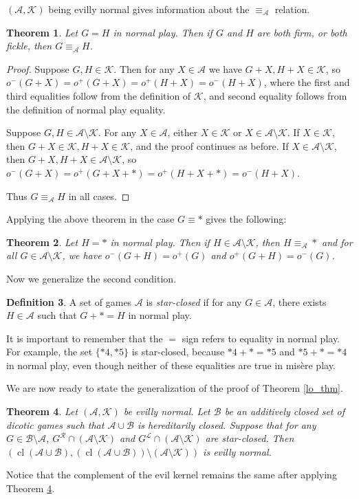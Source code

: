 \documentclass{amsart}
\theoremstyle{plain}
\newtheorem{thm}{Theorem}
\theoremstyle{definition}
\newtheorem{defn}[thm]{Definition}
\theoremstyle{remark}
\numberwithin{equation}{section}
\numberwithin{thm}{section}
\DeclareMathOperator{\cl}{cl}
\begin{document}
$(\mathscr{A},\mathscr{K})$ being evilly normal gives information about the $\equiv _{\mathscr{A}}$ relation.
\begin{thm}
    Let $G=H$ in normal play. Then if $G $ and $H$ are both firm, or both fickle, then $G \equiv_{\mathscr{A}} H$.
\end{thm}
\begin{proof}
    Suppose $G,H \in \mathscr{K}$. Then for any $X \in \mathscr{A}$ we have $G+X,H+X \in \mathscr{K}$, so $o^-(G+X) = o^+(G+X) = o^+(H+X) = o^-(H+X)$, where the first and third equalities follow from the definition of $\mathscr{K}$, and second equality follows from the definition of normal play equality.

    Suppose $G,H \in \mathscr{A}\setminus \mathscr{K}$. For any $X \in \mathscr{A}$, either $X \in \mathscr{K}$ or $X \in \mathscr{A} \setminus\mathscr{K}  $. If $X \in \mathscr{K}$, then $G+X \in \mathscr{K},H+X \in \mathscr{K}$, and the proof continues as before. If $X \in \mathscr{A} \setminus \mathscr{K}$, then $G+X,H+X \in \mathscr{A}\setminus \mathscr{K}$, so $o^- (G+X) = o^+(G+X+*) = o^+(H+X+*) = o^- (H+ X)$. 

    Thus $G \equiv_{\mathscr{A}} H$ in all cases.
\end{proof}

Applying the above theorem in the case $G \equiv *$ gives the following:

\begin{thm}
    Let $H =*$ in normal play. Then if $H \in \mathscr{A}\setminus \mathscr{K}$, then $H \equiv_{\mathscr{A}} *$ and for all $G \in \mathscr{A} \setminus \mathscr{K} $, we have $o^-(G+H) = o^+(G)$ and $o^+(G+H) = o^-(G)$.
\end{thm}



Now we generalize the second condition.
\begin{defn}
    A set of games $\mathscr{A}$ is \emph{star-closed} if for any $G \in \mathscr{A}$, there exists $H \in \mathscr{A}$ such that $G +*= H$ in normal play.
\end{defn}
 It is important to remember that the $=$ sign refers to equality in normal play. For example, the set $\{*4,*5\}$ is star-closed, because $*4+* = *5$ and $*5+* = *4$ in normal play, even though neither of these equalities are true in mis\`ere play. 

 We are now ready to state the generalization of the proof of Theorem \ref{lo_thm}.

\begin{thm}
\label{a-k extension}
Let $(\mathscr{A},\mathscr{K})$ be evilly normal. Let $\mathscr{B}$ be an additively closed set of dicotic games such 
that $\mathscr{A} \cup \mathscr{B}$ is hereditarily closed. Suppose that for any $G \in \mathscr{B} \setminus \mathscr{A}$, $G^\mathcal{R} \cap (\mathscr{A}\setminus\mathscr{K}) $ and $G^\mathcal{L} \cap (\mathscr{A}\setminus\mathscr{K}) $ are star-closed. Then $(\cl(\mathscr{A}\cup \mathscr{B}),(\cl(\mathscr{A}\cup \mathscr{B})) \setminus (\mathscr{A} \setminus \mathscr{K}))$ is evilly normal.
\end{thm}
Notice that the complement of the evil kernel remains the same after applying Theorem \ref{a-k extension}.
\end{document}
